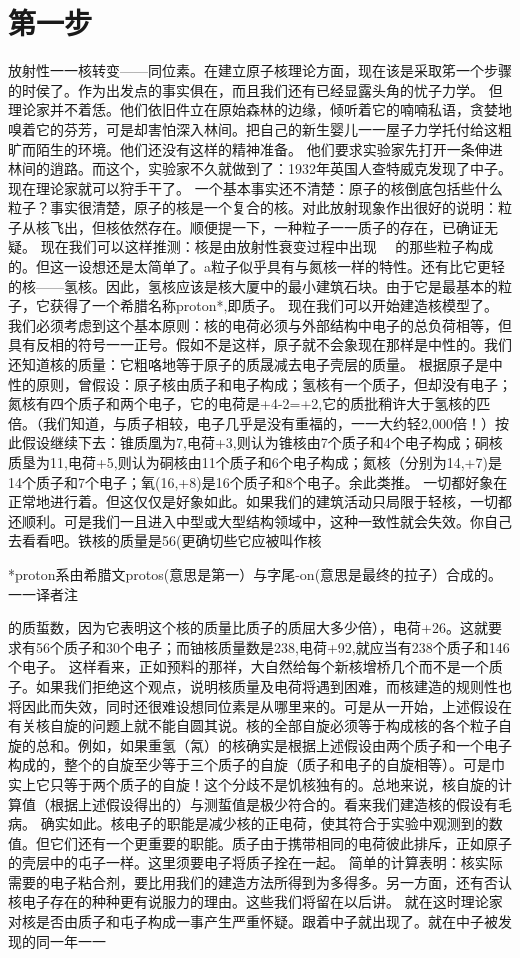 \section{第一步}

放射性一一核转变——同位素。在建立原子核理论方面，现在该是采取笫一个步骤的时侯了。作为出发点的事实俱在，而且我们还有已经显露头角的忧子力学。
但理论家并不着恁。他们依旧件立在原始森林的边缘，倾听着它的喃喃私语，贪婪地嗅着它的芬芳，可是却害怕深入林间。把自己的新生婴儿一一屋子力学托付给这粗旷而陌生的环境。他们还没有这样的精神准备。
他们要求实验家先打开一条伸进林间的逍路。而这个，实验家不久就做到了：1932年英国人查特威克发现了中子。现在理论家就可以狩手干了。
一个基本事实还不清楚：原子的核倒底包括些什么粒子？事实很清楚，原子的核是一个复合的核。对此放射现象作出很好的说明：粒子从核飞出，但核依然存在。顺便提一下，一种粒子一一质子的存在，已确证无疑。
现在我们可以这样推测：核是由放射性衰变过程中出现  的那些粒子构成的。但这一设想还是太简单了。a粒子似乎具有与氮核一样的特性。还有比它更轻的核——氢核。因此，氢核应该是核大厦中的最小建筑石块。由于它是最基本的粒子，它获得了一个希腊名称proton*,即质子。
现在我们可以开始建造核模型了。我们必须考虑到这个基本原则：核的电荷必须与外部结构中电子的总负荷相等，但具有反相的符号一一正号。假如不是这样，原子就不会象现在那样是中性的。我们还知道核的质量：它粗咯地等于原子的质晟减去电子壳层的质量。
根据原子是中性的原则，曾假设：原子核由质子和电子构成；氢核有一个质子，但却没有电子；氮核有四个质子和两个电子，它的电荷是+4-2=+2,它的质批稍许大于氢核的匹倍。（我们知道，与质子相较，电子几乎是没有重福的，一一大约轻2,000倍！）按此假设继续下去：锥质凰为7,电荷+3,则认为锥核由7个质子和4个电子构成；硐核质垦为11,电荷+5,则认为硐核由11个质子和6个电子构成；氮核（分别为14,+7)是14个质子和7个电子；氧(16,+8)是16个质子和8个电子。余此类推。
一切都好象在正常地进行着。但这仅仅是好象如此。如果我们的建筑活动只局限于轻核，一切都还顺利。可是我们一且进入中型或大型结构领域中，这种一致性就会失效。你自己去看看吧。铁核的质量是56(更确切些它应被叫作核

*proton系由希腊文protos(意思是第一）与字尾-on(意思是最终的拉子）合成的。一一译者注


的质蜇数，因为它表明这个核的质量比质子的质屈大多少倍），电荷+26。这就要求有56个质子和30个电子；而铀核质量数是238,电荷+92,就应当有238个质子和146个电子。
这样看来，正如预料的那祥，大自然给每个新核增桥几个而不是一个质子。如果我们拒绝这个观点，说明核质量及电荷将遇到困难，而核建造的规则性也将因此而失效，同时还很难设想同位素是从哪里来的。可是从一开始，上述假设在有关核自旋的问题上就不能自圆其说。核的全部自旋必须等于构成核的各个粒子自旋的总和。例如，如果重氢（氝）的核确实是根据上述假设由两个质子和一个电子构成的，整个的自旋至少等于三个质子的自旋（质子和电子的自旋相等）。可是巾实上它只等于两个质子的自旋！这个分歧不是饥核独有的。总地来说，核自旋的计算值（根据上述假设得出的）与测蜇值是极少符合的。看来我们建造核的假设有毛病。
确实如此。核电子的职能是减少核的正电荷，使其符合于实验中观测到的数值。但它们还有一个更重要的职能。质子由于携带相同的电荷彼此排斥，正如原子的壳层中的屯子一样。这里须要电子将质子拴在一起。
简单的计算表明：核实际需要的电子粘合剂，要比用我们的建造方法所得到为多得多。另一方面，还有否认核电子存在的种种更有说服力的理由。这些我们将留在以后讲。
就在这时理论家对核是否由质子和屯子构成一事产生严重怀疑。跟着中子就出现了。就在中子被发现的同一年一一


